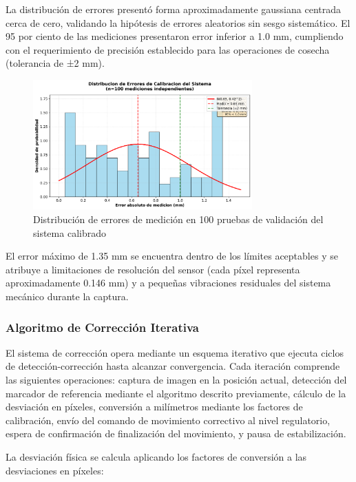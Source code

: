 La distribución de errores presentó forma aproximadamente gaussiana centrada cerca de cero, validando la hipótesis de errores aleatorios sin sesgo sistemático. El 95 por ciento de las mediciones presentaron error inferior a 1.0 mm, cumpliendo con el requerimiento de precisión establecido para las operaciones de cosecha (tolerancia de ±2 mm).

\begin{figure}[h]
\centering
\includegraphics[width=0.75\textwidth]{imagenes/distribucion_errores_calibracion.png}
\caption{Distribución de errores de medición en 100 pruebas de validación del sistema calibrado}
\label{fig:distribucion_errores}
\end{figure}

El error máximo de 1.35 mm se encuentra dentro de los límites aceptables y se atribuye a limitaciones de resolución del sensor (cada píxel representa aproximadamente 0.146 mm) y a pequeñas vibraciones residuales del sistema mecánico durante la captura.

\subsubsection{Algoritmo de Corrección Iterativa}

El sistema de corrección opera mediante un esquema iterativo que ejecuta ciclos de detección-corrección hasta alcanzar convergencia. Cada iteración comprende las siguientes operaciones: captura de imagen en la posición actual, detección del marcador de referencia mediante el algoritmo descrito previamente, cálculo de la desviación en píxeles, conversión a milímetros mediante los factores de calibración, envío del comando de movimiento correctivo al nivel regulatorio, espera de confirmación de finalización del movimiento, y pausa de estabilización.

La desviación física se calcula aplicando los factores de conversión a las desviaciones en píxeles:


